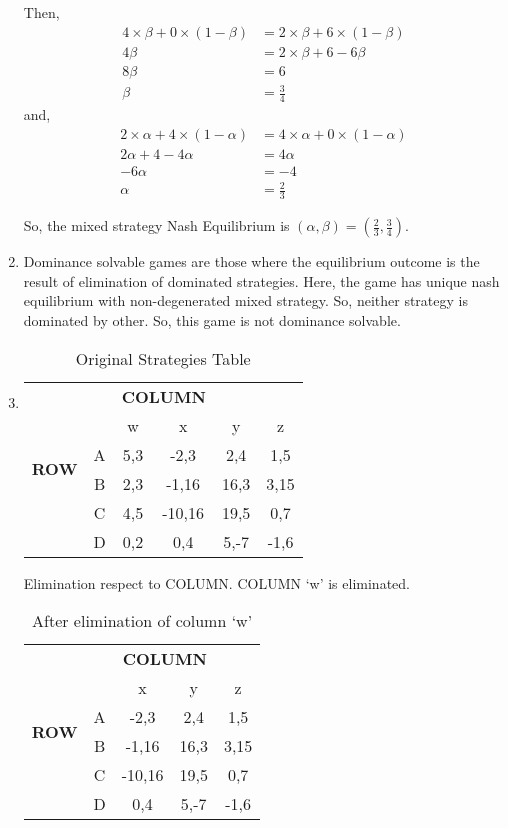 \documentclass[a4paper,12pt]{article}
\begin{document}
\begin{enumerate}
Then,
\begin{align*}
4\times\beta + 0\times(1-\beta)  & = 2\times \beta + 6\times(1-\beta)\\
4\beta &=2\times\beta +6-6\beta\\
8\beta &=6\\
\beta &=\frac{3}{4}
\end{align*}
and,
\begin{align*}
2\times\alpha+4\times(1-\alpha) &=4\times \alpha+0\times(1-\alpha)\\
2\alpha+4-4\alpha &=4\alpha\\
-6\alpha &=-4\\
\alpha &=\frac{2}{3}
\end{align*}

So, the mixed strategy Nash Equilibrium is $(\alpha,\beta)=(\frac{2}{3},\frac{3}{4})$.
\item%
Dominance solvable games are those where the equilibrium outcome is the result of elimination of dominated strategies. Here, the game has unique nash equilibrium with non-degenerated mixed strategy. So, neither strategy is dominated by other. So, this game is not dominance solvable.
\item %
\begin{table}[H]
\centering
\begin{tabular}{@{}cccccc@{}}
\toprule
\multicolumn{2}{c}{} & \multicolumn{2}{c}{\bfseries COLUMN}\\
\multicolumn{2}{c}{} & w & x & y & z\\
\multirow{2}{*}{\bfseries ROW} & A & 5,3 & -2,3 & 2,4 & 1,5\\
 & B & 2,3 & -1,16 & 16,3 & 3,15\\
 & C & 4,5 & -10,16 & 19,5 & 0,7\\
 & D & 0,2 & 0,4 & 5,-7 & -1,6\\
 \bottomrule
\end{tabular}
\caption{Original Strategies Table}
\end{table}

Elimination respect to COLUMN. COLUMN `w' is eliminated.

\begin{table}[h]
\centering
\begin{tabular}{@{}ccccc@{}}
\toprule
\multicolumn{2}{c}{} & \multicolumn{2}{c}{\bfseries COLUMN}\\
\multicolumn{2}{c}{} & x & y & z\\
\multirow{2}{*}{\bfseries ROW} & A & -2,3 & 2,4 & 1,5\\
 & B & -1,16 & 16,3 & 3,15\\
 & C & -10,16 & 19,5 & 0,7\\
 & D & 0,4 & 5,-7 & -1,6\\
 \bottomrule
\end{tabular}
\caption{After elimination of column `w'}
\end{table}


\end{enumerate}
\end{document}
